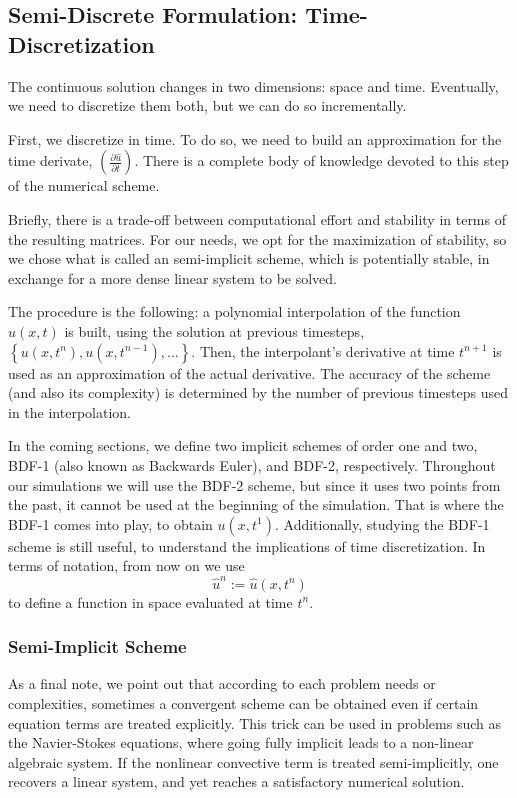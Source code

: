 \documentclass[../../thesis.tex]{subfiles}
\begin{document}
\subsection{Semi-Discrete Formulation: Time-Discretization}
The continuous solution changes in two dimensions: space and time.
Eventually, we need to discretize them both, but we can do so incrementally.

First, we discretize in time. 
To do so, we need to build an approximation for the time derivate, $\left(\frac{\partial \hat{u}}{\partial t}\right)$.
There is a complete body of knowledge devoted to this step of the numerical scheme.

Briefly, there is a trade-off between computational effort and stability in terms of the resulting matrices.
For our needs, we opt for the maximization of stability, so we chose what is called an semi-implicit scheme, 
which is potentially stable, in exchange for a more dense linear system to be solved.

The procedure is the following: a polynomial interpolation of the function $u(x,t)$ is built, 
using the solution at previous timesteps, $\left\{u(x,t^{n}), u(x,t^{n-1}), \ldots\right\}$.
Then, the interpolant's derivative at time $t^{n+1}$ is used as an approximation of the actual derivative.
The accuracy of the scheme (and also its complexity) is determined by the number of previous timesteps used in the interpolation. 

In the coming sections, we define two implicit schemes of order one and two, BDF-1 (also known as Backwards Euler), and BDF-2, respectively.
Throughout our simulations we will use the BDF-2 scheme, but since it uses two points from the past, 
it cannot be used at the beginning of the simulation. 
That is where the BDF-1 comes into play, to obtain $u(x,t^1)$.
Additionally, studying the BDF-1 scheme is still useful, to understand the implications of time discretization. 
In terms of notation, from now on we use
\begin{equation}
    \hat{u}^n := \hat{u}(x,t^n)
\end{equation}
to define a function in space evaluated at time $t^n$.

\subsubsection{Semi-Implicit Scheme}
As a final note, we point out that according to each problem needs or complexities, sometimes a convergent scheme can be obtained even if certain equation terms are treated explicitly.
This trick can be used in problems such as the Navier-Stokes equations, where going fully implicit leads to a non-linear algebraic system. 
If the nonlinear convective term is treated semi-implicitly, one recovers a linear system, and yet reaches a satisfactory numerical solution.
\end{document}
